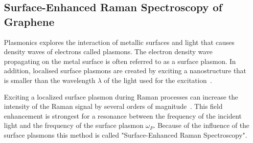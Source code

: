 \subsection{Surface-Enhanced Raman Spectroscopy of Graphene}

Plasmonics explores the interaction of metallic surfaces and light that causes density waves of electrons called plasmons. The electron density wave propagating on the metal surface is often referred to as a surface plasmon. In addition, localised surface plasmons are created by exciting a nanostructure that is smaller than the wavelength $\lambda$ of the light used for the excitation~\cite{maier2007}.

Exciting a localized surface plasmon during Raman processes can increase the intensity of the Raman signal by several orders of magnitude~\cite{maier2007}. This field enhancement is strongest for a resonance between the frequency of the incident light and the frequency of the surface plasmon $\omega_P$. Because of the influence of the surface plasmons this method is called "Surface-Enhanced Raman Spectroscopy".

